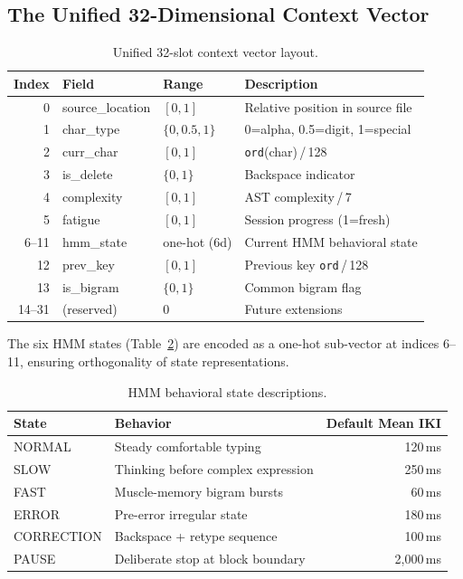 \documentclass[sigconf,nonacm]{acmart}
\begin{document}
\subsection{The Unified 32-Dimensional Context Vector}
\label{sec:ctx}

\begin{table}[t]
\centering
\caption{Unified 32-slot context vector layout.}
\begin{tabular}{rllp{5.5cm}}
\toprule
Index & Field & Range & Description \\
\midrule
0     & source\_location & $[0,1]$         & Relative position in source file \\
1     & char\_type       & $\{0,0.5,1\}$   & 0=alpha, 0.5=digit, 1=special \\
2     & curr\_char       & $[0,1]$         & \texttt{ord}(char)\,/\,128 \\
3     & is\_delete       & $\{0,1\}$       & Backspace indicator \\
4     & complexity       & $[0,1]$         & AST complexity\,/\,7 \\
5     & fatigue          & $[0,1]$         & Session progress (1=fresh) \\
6--11 & hmm\_state       & one-hot (6d)    & Current HMM behavioral state \\
12    & prev\_key        & $[0,1]$         & Previous key \texttt{ord}\,/\,128 \\
13    & is\_bigram       & $\{0,1\}$       & Common bigram flag \\
14--31 & (reserved)      & 0               & Future extensions \\
\bottomrule
\end{tabular}
\label{tab:ctx}
\end{table}

The six HMM states (Table~\ref{tab:hmm}) are encoded as a one-hot sub-vector
at indices 6--11, ensuring orthogonality of state representations.

\begin{table}[t]
\centering\small
\caption{HMM behavioral state descriptions.}
\begin{tabular}{llr}
\toprule
State & Behavior & Default Mean IKI \\
\midrule
NORMAL     & Steady comfortable typing          & 120\,ms \\
SLOW       & Thinking before complex expression & 250\,ms \\
FAST       & Muscle-memory bigram bursts        &  60\,ms \\
ERROR      & Pre-error irregular state          & 180\,ms \\
CORRECTION & Backspace + retype sequence        & 100\,ms \\
PAUSE      & Deliberate stop at block boundary  & 2{,}000\,ms \\
\bottomrule
\end{tabular}
\label{tab:hmm}
\end{table}
\end{document}
